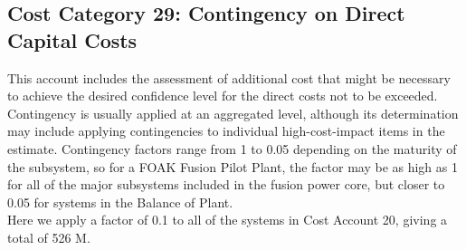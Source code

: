 \subsection{Cost Category 29: Contingency on Direct Capital Costs}

This account includes the assessment of additional
cost that might be necessary to achieve the desired confidence level for the direct costs not to be
exceeded. Contingency is usually applied at an aggregated level, although its determination may
include applying contingencies to individual high-cost-impact items in the estimate. 
Contingency factors range from 1 to 0.05 depending on the maturity of the subsystem, so for 
a FOAK Fusion Pilot Plant, the factor may be as high as 1 for all of the major subsystems
included in the fusion power core, but closer to 0.05 for systems in the Balance of Plant.  \\

Here we apply a factor of 0.1 to all of the systems in Cost Account 20, giving a total of 
526 M.

